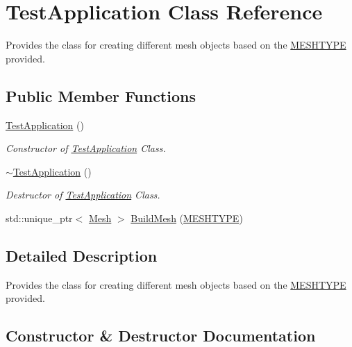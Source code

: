 \hypertarget{class_test_application}{}\section{Test\+Application Class Reference}
\label{class_test_application}


Provides the class for creating different mesh objects based on the \mbox{\hyperlink{class_m_e_s_h_t_y_p_e}{M\+E\+S\+H\+T\+Y\+PE}} provided.  


\subsection*{Public Member Functions}
\begin{DoxyCompactItemize}
\item 
\mbox{\hyperlink{class_test_application_a25907e98ea5db76b79134e54148cd1fa}{Test\+Application}} ()
\begin{DoxyCompactList}\small\item\em Constructor of \mbox{\hyperlink{class_test_application}{Test\+Application}} Class. \end{DoxyCompactList}\item 
\mbox{\hyperlink{class_test_application_ab2701e0dc10fdeabe85044794f1b334c}{$\sim$\+Test\+Application}} ()
\begin{DoxyCompactList}\small\item\em Destructor of \mbox{\hyperlink{class_test_application}{Test\+Application}} Class. \end{DoxyCompactList}\item 
std\+::unique\+\_\+ptr$<$ \mbox{\hyperlink{class_mesh}{Mesh}} $>$ \mbox{\hyperlink{class_test_application_a5bab36dee766e9d86f7edc692e807a27}{Build\+Mesh}} (\mbox{\hyperlink{class_m_e_s_h_t_y_p_e}{M\+E\+S\+H\+T\+Y\+PE}})
\end{DoxyCompactItemize}


\subsection{Detailed Description}
Provides the class for creating different mesh objects based on the \mbox{\hyperlink{class_m_e_s_h_t_y_p_e}{M\+E\+S\+H\+T\+Y\+PE}} provided. 

\subsection{Constructor \& Destructor Documentation}
\mbox{\label{class_test_application_a25907e98ea5db76b79134e54148cd1fa}} 

